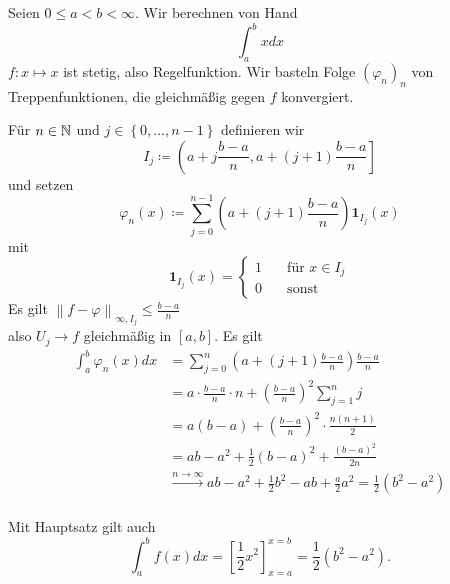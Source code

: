 \begin{subexample}
	Seien $ 0 \leq  a < b < \infty $. Wir berechnen von Hand
	\[
		\int_{a}^{b}x dx 
	\]
	$ f : x \mapsto x $ ist stetig, also Regelfunktion. Wir basteln Folge $ (\varphi_n)_n $ von Treppenfunktionen, die gleichmäßig gegen $ f $ konvergiert.

	Für $ n \in \mathbb{N}  $ und $ j \in \left\{ 0, \dotsc, n - 1 \right\}  $ definieren wir
	\[
		I_j \coloneqq  \left( a + j \frac{ b - a }{ n } , a + (j + 1) \frac{b - a}{ n }  \right]
	\]
	und setzen 
	\[
		\varphi_n (x) \coloneqq  \sum_{j = 0}^{n - 1} \left( a + ( j + 1) \frac{b - a}{ n }  \right) \mathbf{1} _{I_j} (x)
	\]
	mit
	\[
		\mathbf{1}_{I_j} (x) = \begin{cases}
			1 &\quad \text{für } x \in I_j\\
			0 &\quad \text{sonst} 
		\end{cases}
	\]
	Es gilt $ \left\| f - \varphi \right\| _{\infty, I_j} \leq \frac{ b - a }{ n }  $ \\
	also $ U_j \to f $ gleichmäßig in $ [a, b] $.
	Es gilt
	\begin{align*}
		\int_{a}^{b} \varphi_n (x) dx &= \sum_{j = 0}^{n} \left( a + ( j + 1) \frac{ b - a }{ n }  \right) \frac{ b - a }{ n } \\
		~&= a \cdot \frac{ b - a }{ n } \cdot n + \left( \frac{ b- a}{ n }  \right) ^2 \sum_{j=1}^{n} j \\
		~&= a(b-a) + \left( \frac{ b- a }{ n }  \right) ^2 \cdot \frac{ n ( n + 1 ) }{ 2 }  \\
		~&= ab - a^2 + \frac{ 1 }{ 2 } ( b - a )^2 + \frac{( b - a )^2}{ 2n } \\
		~&\overset{n\to \infty}{\to } ab - a^2 + \frac{ 1 }{ 2 } b^2 - ab + \frac{ a }{ 2 } a^2 = \frac{ 1 }{ 2 } ( b^2 - a^2 ) \\
	\end{align*}

	Mit Hauptsatz gilt auch
	\[
		\int_{a}^{b} f(x) dx = \left[ \frac{ 1 }{ 2 } x^2 \right]_{x = a}^{x = b} = \frac{ 1 }{ 2 } (b^2 - a^2).
	\]
	
\end{subexample}

